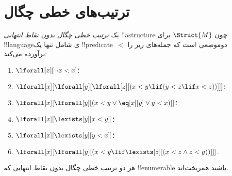 \documentclass[../../../include/open-logic-section]{subfiles}
\begin{document}
\section{ترتیب‌های خطی چگال}

\begin{defn}
  یک \emph{ترتیب خطی چگال بدون نقاط انتهایی} !!a{structure} چون
  $\Struct{M}$ برای !!{language}ی شامل تنها یک
  !!{predicate}~$<$ دوموضعی است که جمله‌های زیر را برآورده می‌کند:
  \begin{enumerate}
  \item $\lforall[x][\lnot x < x]$؛
  \item $\lforall[x][\lforall[y][\lforall[z][(x < y \lif (y < z \lif x
    <z ))]]]$؛
  \item $\lforall[x][\lforall[y][(x< y \lor \eq[x][y] \lor y < x)]]$؛
  \item $\lforall[x][\lexists[y][x < y]]$؛
  \item $\lforall[x][\lexists[y][y < x]]$؛
  \item $\lforall[x][\lforall[y][(x < y \lif \lexists[z][(x < z \land
        z < y))]]]$.
 \end{enumerate}
\end{defn}

\begin{thm}
  هر دو ترتیب خطی چگال بدون نقاط انتهایی که !!{enumerable} باشند
  همریخت‌اند.
\end{thm}
\end{document}
